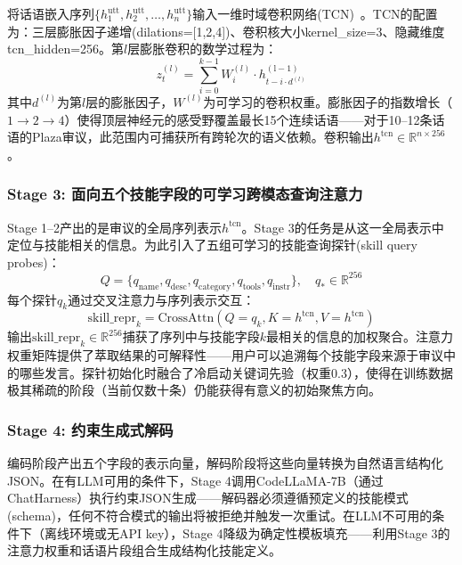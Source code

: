 \documentclass[twocolumn,10.5pt]{ctexart}
\begin{document}
将话语嵌入序列$\{h_1^{\mathrm{utt}}, h_2^{\mathrm{utt}}, \ldots, h_n^{\mathrm{utt}}\}$输入一维时域卷积网络(TCN)~\cite{bai2018tcn}。TCN的配置为：三层膨胀因子递增(dilations=[1,2,4])、卷积核大小kernel\_size=3、隐藏维度tcn\_hidden=256。第$l$层膨胀卷积的数学过程为：
\begin{equation}
  z^{(l)}_t = \sum_{i=0}^{k-1} W^{(l)}_i \cdot h^{\mathrm{(l-1)}}_{t - i \cdot d^{(l)}}
\end{equation}
其中$d^{(l)}$为第$l$层的膨胀因子，$W^{(l)}$为可学习的卷积权重。膨胀因子的指数增长（$1\rightarrow2\rightarrow4$）使得顶层神经元的感受野覆盖最长15个连续话语——对于10--12条话语的Plaza审议，此范围内可捕获所有跨轮次的语义依赖。卷积输出$h^{\mathrm{tcn}} \in \mathbb{R}^{n\times256}$。

\subsubsection{Stage 3: 面向五个技能字段的可学习跨模态查询注意力}

Stage 1--2产出的是审议的全局序列表示$h^{\mathrm{tcn}}$。Stage 3的任务是从这一全局表示中定位与技能相关的信息。为此引入了五组可学习的技能查询探针(skill query probes)：
\begin{equation}
  Q = \{q_{\mathrm{name}}, q_{\mathrm{desc}}, q_{\mathrm{category}}, q_{\mathrm{tools}}, q_{\mathrm{instr}}\},\quad q_* \in \mathbb{R}^{256}
\end{equation}
每个探针$q_k$通过交叉注意力与序列表示交互：
\begin{equation}
  \mathrm{skill\_repr}_k = \mathrm{CrossAttn}(Q=q_k, K=h^{\mathrm{tcn}}, V=h^{\mathrm{tcn}})
\end{equation}
输出$\mathrm{skill\_repr}_k \in \mathbb{R}^{256}$捕获了序列中与技能字段$k$最相关的信息的加权聚合。注意力权重矩阵提供了萃取结果的可解释性——用户可以追溯每个技能字段来源于审议中的哪些发言。探针初始化时融合了冷启动关键词先验（权重0.3），使得在训练数据极其稀疏的阶段（当前仅数十条）仍能获得有意义的初始聚焦方向。

\subsubsection{Stage 4: 约束生成式解码}

编码阶段产出五个字段的表示向量，解码阶段将这些向量转换为自然语言结构化JSON。在有LLM可用的条件下，Stage 4调用CodeLLaMA-7B（通过ChatHarness）执行约束JSON生成——解码器必须遵循预定义的技能模式(schema)，任何不符合模式的输出将被拒绝并触发一次重试。在LLM不可用的条件下（离线环境或无API key），Stage 4降级为确定性模板填充——利用Stage 3的注意力权重和话语片段组合生成结构化技能定义。
\end{document}
